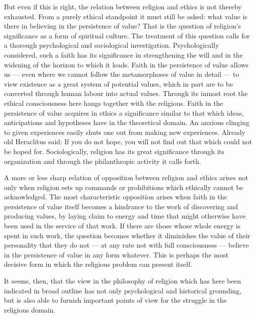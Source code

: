 \documentclass[12pt,a4paper]{article}
\newcommand{\opage}[1]{\marginnote{\footnotesize\textit{[#1]}}}
\begin{document}
But even if this is right, the relation between religion and ethics is not
thereby exhausted. From a purely ethical standpoint it must still be asked:
what value is there in believing in the persistence of value? That is the
question of religion's significance as a form of spiritual culture. The
treatment of this question calls for a thorough psychological and sociological
investigation. Psychologically considered, such a faith has its significance in
strengthening the will and in the widening of the horizon to which it leads.
Faith in the persistence of value allows us --- even where we cannot follow the
metamorphoses of value in detail --- to view existence as a great system of
potential values, which in part are to be converted through human labour into
actual values. Through its inmost root the ethical consciousness here hangs
together with the religious. Faith in the persistence of value acquires in
ethics a significance similar to that which ideas, anticipations and hypotheses
have in the theoretical domain. An anxious clinging to given experiences easily
shuts one out from making new experiences. Already old Heraclitus said: If you
do not hope, you will not find out that which could not be hoped for.
Sociologically, religion has its great significance through its organization
and through the philanthropic activity it calls forth.

A more or less sharp relation of opposition between religion and ethics arises
not only when religion sets up commands or prohibitions which ethically cannot
be acknowledged. The most characteristic opposition arises when faith in the
persistence of value itself becomes a hindrance to the work of
\opage{421}discovering and producing values, by laying claim to energy and time that might
otherwise have been used in the service of that work. If there are those whose
whole energy is spent in such work, the question becomes whether it diminishes
the value of their personality that they do not --- at any rate not with full
consciousness --- believe in the persistence of value in any form whatever.
This is perhaps the most decisive form in which the religious problem can
present itself.

It seems, then, that the view in the philosophy of religion which has here been
indicated in broad outline has not only psychological and historical grounding,
but is also able to furnish important points of view for the struggle in the
religious domain.
\end{document}
